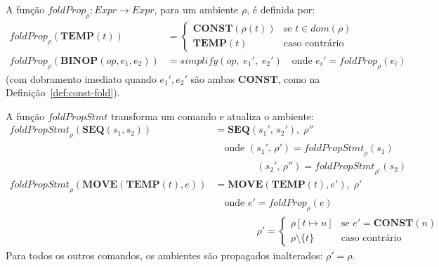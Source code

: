 \begin{Definition}\label{def:fold-prop-expr}
  A função $\mathit{foldProp}_\rho : \mathit{Expr} \to \mathit{Expr}$, para um
  ambiente $\rho$, é definida por:
  \begin{align*}
    \mathit{foldProp}_\rho(\mathbf{TEMP}(t)) &=
    \begin{cases}
      \mathbf{CONST}(\rho(t)) & \text{se } t \in \mathit{dom}(\rho) \\
      \mathbf{TEMP}(t)        & \text{caso contrário}
    \end{cases} \\[4pt]
    \mathit{foldProp}_\rho(\mathbf{BINOP}(\mathit{op}, e_1, e_2)) &=
    \mathit{simplify}\!\left(\mathit{op},\; e_1',\; e_2'\right)
    \quad \text{onde } e_i' = \mathit{foldProp}_\rho(e_i)
  \end{align*}
  (com dobramento imediato quando $e_1', e_2'$ são ambas $\mathbf{CONST}$,
  como na Definição~\ref{def:const-fold}).
\end{Definition}

\begin{Definition}\label{def:fold-prop-stmt}
  A função $\mathit{foldPropStmt}$ transforma um comando e atualiza o ambiente:
  \begin{align*}
    \mathit{foldPropStmt}_\rho(\mathbf{SEQ}(s_1, s_2))
    &= \mathbf{SEQ}(s_1',\, s_2'),\; \rho''
    \\
    &\quad \text{onde } (s_1',\, \rho') = \mathit{foldPropStmt}_\rho(s_1)
    \\
    &\quad\quad\quad\quad\; (s_2',\, \rho'') =
    \mathit{foldPropStmt}_{\rho'}(s_2)
    \\[6pt]
    \mathit{foldPropStmt}_\rho(\mathbf{MOVE}(\mathbf{TEMP}(t), e))
    &= \mathbf{MOVE}(\mathbf{TEMP}(t), e'),\; \rho'
    \\
    &\quad \text{onde } e' = \mathit{foldProp}_\rho(e)
    \\
    &\quad\quad\quad\quad\; \rho' =
    \begin{cases}
      \rho[t \mapsto n] & \text{se } e' = \mathbf{CONST}(n) \\
      \rho \setminus \{t\} & \text{caso contrário}
    \end{cases}
  \end{align*}
  Para todos os outros comandos, os ambientes são propagados
  inalterados: $\rho' = \rho$.
\end{Definition}

